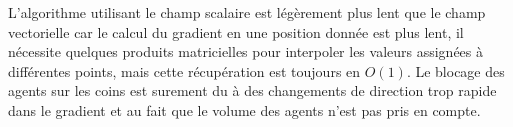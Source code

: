 \documentclass{article}
\begin{document}
L'algorithme utilisant le champ scalaire est légèrement plus lent que le champ
vectorielle car le calcul du gradient en une position donnée est plus lent,
il nécessite quelques produits matricielles pour interpoler les valeurs assignées
à différentes points, mais cette récupération est toujours en $O(1)$. Le blocage des
agents sur les coins est surement du à des changements de direction trop rapide
dans le gradient et au fait que le volume des agents n'est pas pris en compte.

\end{document}
